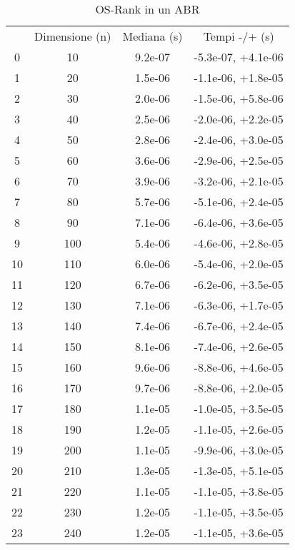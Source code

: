 \begin{table}
\centering
\caption{OS-Rank in un ABR}
\label{OS-Rank in un ABR}
\begin{adjustbox}{width=1\textwidth/2}
\begin{tabular}{|c|c|c|c|}
\hline
 & Dimensione (n) & Mediana (s) & Tempi -/+ (s) \\
0 & 10 & 9.2e-07 & -5.3e-07, +4.1e-06 \\
\cline{1-4}
1 & 20 & 1.5e-06 & -1.1e-06, +1.8e-05 \\
\cline{1-4}
2 & 30 & 2.0e-06 & -1.5e-06, +5.8e-06 \\
\cline{1-4}
3 & 40 & 2.5e-06 & -2.0e-06, +2.2e-05 \\
\cline{1-4}
4 & 50 & 2.8e-06 & -2.4e-06, +3.0e-05 \\
\cline{1-4}
5 & 60 & 3.6e-06 & -2.9e-06, +2.5e-05 \\
\cline{1-4}
6 & 70 & 3.9e-06 & -3.2e-06, +2.1e-05 \\
\cline{1-4}
7 & 80 & 5.7e-06 & -5.1e-06, +2.4e-05 \\
\cline{1-4}
8 & 90 & 7.1e-06 & -6.4e-06, +3.6e-05 \\
\cline{1-4}
9 & 100 & 5.4e-06 & -4.6e-06, +2.8e-05 \\
\cline{1-4}
10 & 110 & 6.0e-06 & -5.4e-06, +2.0e-05 \\
\cline{1-4}
11 & 120 & 6.7e-06 & -6.2e-06, +3.5e-05 \\
\cline{1-4}
12 & 130 & 7.1e-06 & -6.3e-06, +1.7e-05 \\
\cline{1-4}
13 & 140 & 7.4e-06 & -6.7e-06, +2.4e-05 \\
\cline{1-4}
14 & 150 & 8.1e-06 & -7.4e-06, +2.6e-05 \\
\cline{1-4}
15 & 160 & 9.6e-06 & -8.8e-06, +4.6e-05 \\
\cline{1-4}
16 & 170 & 9.7e-06 & -8.8e-06, +2.0e-05 \\
\cline{1-4}
17 & 180 & 1.1e-05 & -1.0e-05, +3.5e-05 \\
\cline{1-4}
18 & 190 & 1.2e-05 & -1.1e-05, +2.6e-05 \\
\cline{1-4}
19 & 200 & 1.1e-05 & -9.9e-06, +3.0e-05 \\
\cline{1-4}
20 & 210 & 1.3e-05 & -1.3e-05, +5.1e-05 \\
\cline{1-4}
21 & 220 & 1.1e-05 & -1.1e-05, +3.8e-05 \\
\cline{1-4}
22 & 230 & 1.2e-05 & -1.1e-05, +3.5e-05 \\
\cline{1-4}
23 & 240 & 1.2e-05 & -1.1e-05, +3.6e-05 \\

\end{tabular}
\end{adjustbox}
\end{table}

